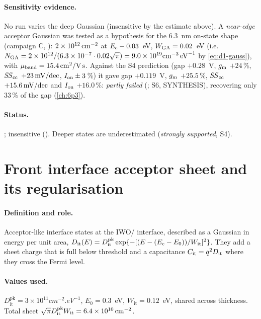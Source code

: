 \paragraph{Sensitivity evidence.}
No run varies the deep Gaussian (insensitive by the estimate above). A \emph{near-edge} acceptor Gaussian was tested
as a hypothesis for the 6.3~nm on-state shape (campaign C, ): $2\times10^{12}\cmsq$ at $\Ec-0.03$~eV,
$\WGA = 0.02$~eV (i.e.\ $\NGA = 2\times10^{12}/(6.3\times10^{-7}\cdot0.02\sqrt{\pi}) = 9.0\times10^{19}\si{cm^{-3}.eV^{-1}}$
by \cref{eq:d1-gauss}), with $\muband = 15.4\cmVs$. Against the S4 prediction (gap $+0.28$~V, $\gm$ $+24$\,\%, $\SScc$
$+23\mVdec$, $\Ion \pm3$\,\%) it gave gap $+0.119$~V, $\gm$ $+25.5$\,\%, $\SScc$ $+15.6\mVdec$ and $\Ion$ $+16.0$\,\%:
\emph{partly failed} (\evOOS; S6, SYNTHESIS), recovering only 33\,\% of the gap (\cref{ch:6p3}).

\paragraph{Status.}
; insensitive (\evTHEORY). Deeper states are underestimated (\emph{strongly supported}, S4).

\section{Front interface acceptor sheet and its regularisation}
\label{sec:par-dit}

\paragraph{Definition and role.}
Acceptor-like interface states at the IWO/\AlO{} interface, described as a Gaussian in energy per unit area,
$\Dit(E) = D_{\mathrm{it}}^{\mathrm{pk}}\exp\{-[(E-(\Ec-E_0))/W_{\mathrm{it}}]^2\}$. They add a sheet charge that is
full below threshold and a capacitance $C_{\mathrm{it}} = q^2\Dit$ where they cross the Fermi level.

\paragraph{Values used.}
$D_{\mathrm{it}}^{\mathrm{pk}} = 3\times10^{11}\si{cm^{-2}.eV^{-1}}$, $E_0 = 0.3$~eV, $W_{\mathrm{it}} = 0.12$~eV, shared across
thickness. Total sheet $\sqrt{\pi}D_{\mathrm{it}}^{\mathrm{pk}}W_{\mathrm{it}} = 6.4\times10^{10}\cmsq$.

